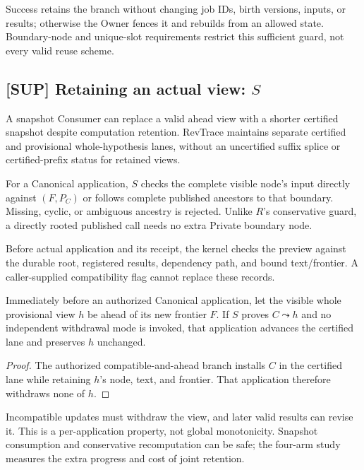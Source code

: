 Success retains the branch without changing job IDs, birth versions,
inputs, or results; otherwise the Owner fences it and rebuilds from an
allowed state. Boundary-node and unique-slot requirements restrict this
sufficient guard, not every valid reuse scheme.

\subsection{[SUP] Retaining an actual view: \texorpdfstring{$S$}{S}}
A snapshot Consumer can replace a valid ahead view with a shorter
certified snapshot despite computation retention. RevTrace maintains
separate certified and provisional whole-hypothesis lanes, without an
uncertified suffix splice or certified-prefix status for retained views.

For a Canonical application, $S$ checks the complete visible node's input
directly against $(F,P_C)$ or follows complete published ancestors to
that boundary. Missing, cyclic, or ambiguous ancestry is rejected. Unlike
$R$'s conservative guard, a directly rooted published call needs no extra
Private boundary node.

Before actual application and its receipt, the kernel checks the preview
against the durable root, registered results, dependency path, and bound
text/frontier. A caller-supplied compatibility flag cannot replace these
records.

\begin{proposition}
\label{prop:continuity}
Immediately before an authorized Canonical application, let the visible
whole provisional view $h$ be ahead of its new frontier $F$. If $S$ proves
$C\leadsto h$ and no independent withdrawal mode is invoked, that
application advances the certified lane and preserves $h$ unchanged.
\end{proposition}
\begin{proof}
The authorized compatible-and-ahead branch installs $C$ in the certified
lane while retaining $h$'s node, text, and frontier. That application
therefore withdraws none of $h$.
\end{proof}

Incompatible updates must withdraw the view, and later valid results can
revise it. This is a per-application property, not global monotonicity.
Snapshot consumption and conservative recomputation can be safe; the
four-arm study measures the extra progress and cost of joint retention.
